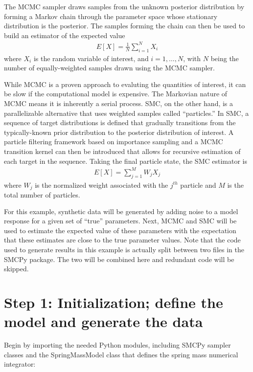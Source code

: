 \documentclass[letterpaper,10pt,english]{sphinxmanual}
\begin{document}
The MCMC sampler draws samples from the unknown posterior distribution
by forming a Markov chain through the parameter space whose stationary
distribution is the posterior. The samples forming the chain can then be used
to build an estimator of the expected value
\begin{equation*}
\begin{split}E[X] = \frac{1}{N} \sum_{i=1}^N X_i\end{split}
\end{equation*}
where \(X_i\) is the random variable of interest, and \(i=1,\ldots,N\), with \(N\) being the number of equally-weighted samples drawn using the MCMC sampler.

While MCMC is a proven approach to evaluting the quantities of interest, it can
be slow if the computational model is expensive. The Markovian nature of MCMC
means it is inherently a serial process. SMC, on the other hand, is a
parallelizable alternative that uses weighted samples called “particles.” In
SMC, a sequence of target distributions is defined that gradually transitions
from the typically-known prior distribution to the posterior distribution of
interest. A particle filtering framework based on importance sampling and a
MCMC transition kernel can then be introduced that allows for recursive
estimation of each target in the sequence. Taking the final particle state, the
SMC estimator is
\begin{equation*}
\begin{split}E[X] = \sum_{j=1}^M W_j X_j\end{split}
\end{equation*}
where \(W_j\) is the normalized weight associated with the \(j^{th}\) particle and \(M\) is the total number of particles.

For this example, synthetic data will be generated by adding noise to a model response for a given set of “true” parameters. Next, MCMC and SMC will be used to estimate the expected value of these parameters with the expectation that these estimates are close to the true parameter values. Note that the code used to generate results in this example is actually split between two files in the SMCPy package. The two will be combined here and redundant code will be skipped.


\section{Step 1: Initialization; define the model and generate the data}
\label{\detokenize{example:step-1-initialization-define-the-model-and-generate-the-data}}
Begin by importing the needed Python modules, including SMCPy sampler classes
and the SpringMassModel class that defines the spring mass numerical
integrator:
\end{document}
